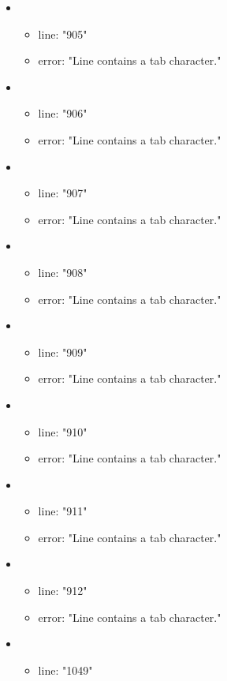 \begin{itemize}
	\item 
	\begin{itemize} 
		\item line: "905" 
		\item error: "Line contains a tab character." 
	\end{itemize}
	\item 
	\begin{itemize} 
		\item line: "906" 
		\item error: "Line contains a tab character." 
	\end{itemize}
	\item 
	\begin{itemize} 
		\item line: "907" 
		\item error: "Line contains a tab character." 
	\end{itemize}
	\item 
	\begin{itemize} 
		\item line: "908" 
		\item error: "Line contains a tab character." 
	\end{itemize}
	\item 
	\begin{itemize} 
		\item line: "909" 
		\item error: "Line contains a tab character." 
	\end{itemize}
	\item 
	\begin{itemize} 
		\item line: "910" 
		\item error: "Line contains a tab character." 
	\end{itemize}
	\item 
	\begin{itemize} 
		\item line: "911" 
		\item error: "Line contains a tab character." 
	\end{itemize}
	\item 
	\begin{itemize} 
		\item line: "912" 
		\item error: "Line contains a tab character." 
	\end{itemize}
	\item 
	\begin{itemize} 
		\item line: "1049" 

\end{itemize}
\end{itemize}
